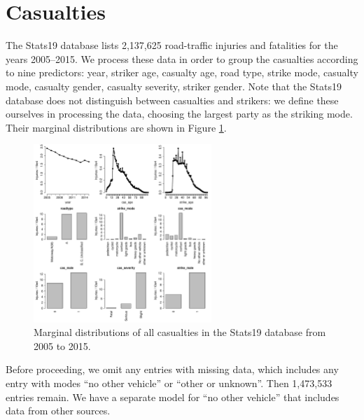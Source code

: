 \documentclass{article}
\begin{document}


\section{Casualties}\label{injuries}

The Stats19 database lists 2,137,625 road-traffic injuries and fatalities for the years 2005--2015. We process these data in order to group the casualties according to nine predictors: year, striker age, casualty age, road type, strike mode, casualty mode, casualty gender, casualty severity, striker gender. Note that the Stats19 database does not distinguish between casualties and strikers: we define these ourselves in processing the data, choosing the largest party as the striking mode. Their marginal distributions are shown in Figure \ref{descriptive}.

\begin{figure}[H]
\centering
\includegraphics[width=0.6\textwidth]{descriptive.pdf}
\caption{\small Marginal distributions of all casualties in the Stats19 database from 2005 to 2015.}
\label{descriptive}
\end{figure}

Before proceeding, we omit any entries with missing data, which includes any entry with modes ``no other vehicle'' or ``other or unknown''. Then 1,473,533 entries remain. We have a separate model for ``no other vehicle'' that includes data from other sources.
\end{document}
